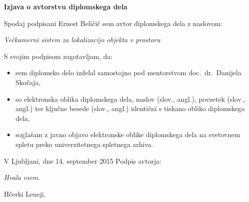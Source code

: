 \documentclass[a4paper, 12pt]{book}
\newcommand{\clearemptydoublepage}{\newpage{\pagestyle{empty}\cleardoublepage}}
\begin{document}
\vspace{2cm}

\clearemptydoublepage

\vspace*{1cm}
\begin{center}
{\Large \textbf{\sc Izjava o avtorstvu diplomskega dela}}
\end{center}

\vspace{1cm}
\noindent Spodaj podpisani Ernest Beličič sem avtor  diplomskega dela z naslovom:

\vspace{0.5cm}
\emph{Večkamerni sistem za lokalizacijo objekta v prostoru}

\vspace{1.5cm}
\noindent S svojim podpisom zagotavljam, da:
\begin{itemize}
	\item sem diplomsko delo izdelal samostojno pod mentorstvom
		doc.\ dr.\ Danijela Skočaja,

	\item	so elektronska oblika diplomskega dela, naslov (slov., angl.), povzetek (slov., angl.) ter ključne besede (slov., angl.) identični s tiskano obliko diplomskega dela,
	\item soglašam z javno objavo elektronske oblike diplomskega dela na svetovnem spletu preko univerzitetnega spletnega arhiva.	
\end{itemize}

\vspace{1cm}
\noindent V Ljubljani, dne 14. september 2015 \hfill Podpis avtorja:

\clearemptydoublepage

\thispagestyle{empty}\mbox{}\vfill\null\it%
Hvala vsem.
\rm\normalfont

\clearemptydoublepage

\thispagestyle{empty}\mbox{}{\textheight}\mbox{}\hfill\begin{minipage}{0.55\textwidth}%
Hčerki Leneji.
\normalfont\end{minipage}

\clearemptydoublepage

\def\thepage{}%
\tableofcontents{}
\end{document}
